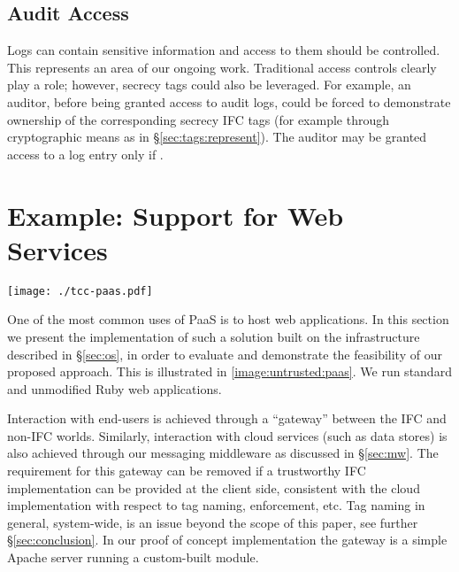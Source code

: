 \documentclass[10pt,journal,compsoc]{IEEEtran}
\begin{document}
\subsection{Audit Access}

Logs can contain sensitive information and access to them should be controlled. 
This represents an area of our ongoing work.
 Traditional access controls clearly play a role; however, secrecy tags could also be leveraged.
For example, an auditor, before being granted access to audit logs, could be forced to demonstrate ownership of the corresponding secrecy IFC tags (for example through cryptographic means as in \S\ref{sec:tags:represent}).
The auditor may be granted access to a log entry only if .





 
\section{Example: Support for Web Services}
\label{sec:example}
\begin{figure*}[t]
\centering
  \texttt{[image: ./tcc-paas.pdf]}
  \caption{PaaS Architecture on top of IFC-OS}
  \label{image:untrusted:paas}
\end{figure*}

One of the most common uses of PaaS is to host web applications.
In this section we present the implementation of such a solution built on the infrastructure described in \S\ref{sec:os}, in order to evaluate and demonstrate the feasibility of our proposed approach. 
This is illustrated in  \fig \ref{image:untrusted:paas}.
We run standard and unmodified Ruby web applications.





Interaction with end-users
is achieved through a ``gateway'' between the IFC and non-IFC worlds.
Similarly, interaction with cloud services (such as data stores) is also achieved through our messaging middleware as discussed in \S\ref{sec:mw}. 
The requirement for this gateway can be removed if a trustworthy IFC implementation can be provided at the client side, consistent with the cloud implementation with respect to tag naming, enforcement, etc. 
Tag naming in general, system-wide, is an issue beyond the scope of this paper, see further \S\ref{sec:conclusion}. In our proof of concept implementation the gateway is a simple Apache server running a custom-built module.
\end{document}
